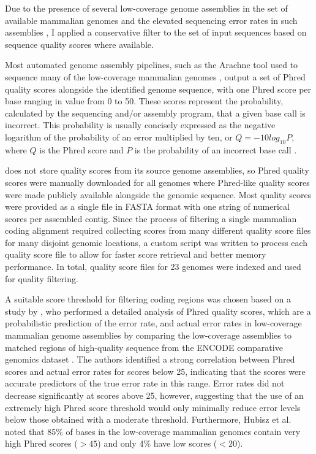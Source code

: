 Due to the presence of several low-coverage genome assemblies in the
set of available mammalian genomes and the elevated sequencing error
rates in such assemblies \citep{Hubbard2007}, I applied a conservative
filter to the set of input sequences based on sequence quality scores
where available.

Most automated genome assembly pipelines, such as the Arachne tool
used to sequence many of the low-coverage mammalian genomes
\citep{Jaffe2003}, output a set of Phred quality scores alongside the
identified genome sequence, with one Phred score per base ranging in
value from 0 to 50. These scores represent the probability, calculated
by the sequencing and/or assembly program, that a given base call is
incorrect. This probability is usually concisely expressed as the
negative logarithm of the probability of an error multiplied by ten,
or $Q=-10log_{10}P$, where $Q$ is the Phred score and $P$ is the
probability of an incorrect base call \citep{Cock2010}.

\ens does not store quality scores from its source genome assemblies,
so Phred quality scores were manually downloaded for all \lcv genomes
where Phred-like quality scores were made publicly available alongside
the genomic sequence. Most quality scores were provided as a single
file in FASTA format with one string of numerical scores per assembled
contig. Since the process of filtering a single mammalian coding
alignment required collecting scores from many different quality score
files for many disjoint genomic locations, a custom script was written
to process each quality score file to allow for faster score retrieval
and better memory performance. In total, quality score files for 23
genomes were indexed and used for quality filtering.

A suitable score threshold for filtering coding regions was chosen
based on a study by \citet{Hubisz2011}, who performed a detailed
analysis of Phred quality scores, which are a probabilistic prediction
of the error rate, and actual error rates in low-coverage mammalian
genome assemblies by comparing the low-coverage assemblies to matched
regions of high-quality sequence from the ENCODE comparative genomics
dataset \citep{Birney2007}. The authors identified a strong
correlation between Phred scores and actual error rates for scores
below 25, indicating that the scores were accurate predictors of the
true error rate in this range. Error rates did not decrease
significantly at scores above 25, however, suggesting that the use of
an extremely high Phred score threshold would only minimally reduce
error levels below those obtained with a moderate
threshold. Furthermore, Hubisz et al. noted that 85\% of bases in the
low-coverage mammalian genomes contain very high Phred scores ($>45$)
and only 4\% have low scores ($<20$).

